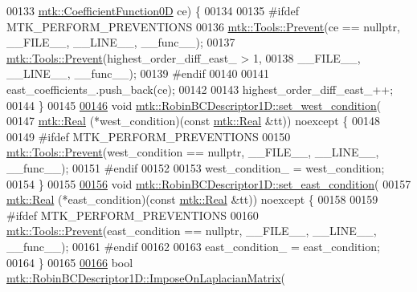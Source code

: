 \begin{DoxyCode}
00133     \hyperlink{group__c07-mim__ops_ga04276745b4d511f0f3c636d6e0df7c2d}{mtk::CoefficientFunction0D} ce) \{
00134 
00135 \textcolor{preprocessor}{  #ifdef MTK\_PERFORM\_PREVENTIONS}
00136   \hyperlink{classmtk_1_1Tools_a332324c6f25e66be9dff48c5987a3b9f}{mtk::Tools::Prevent}(ce == \textcolor{keyword}{nullptr}, \_\_FILE\_\_, \_\_LINE\_\_, \_\_func\_\_);
00137   \hyperlink{classmtk_1_1Tools_a332324c6f25e66be9dff48c5987a3b9f}{mtk::Tools::Prevent}(highest\_order\_diff\_east\_ > 1,
00138                       \_\_FILE\_\_, \_\_LINE\_\_, \_\_func\_\_);
00139 \textcolor{preprocessor}{  #endif}
00140 
00141   east\_coefficients\_.push\_back(ce);
00142 
00143   highest\_order\_diff\_east\_++;
00144 \}
00145 
\hypertarget{mtk__robin__bc__descriptor__1d_8cc_source_l00146}{}\hyperlink{classmtk_1_1RobinBCDescriptor1D_a06bfaf0126d528247c3c76fdd19f4b85}{00146} \textcolor{keywordtype}{void} \hyperlink{classmtk_1_1RobinBCDescriptor1D_a06bfaf0126d528247c3c76fdd19f4b85}{mtk::RobinBCDescriptor1D::set\_west\_condition}(
00147     \hyperlink{group__c01-roots_gac080bbbf5cbb5502c9f00405f894857d}{mtk::Real} (*west\_condition)(\textcolor{keyword}{const} \hyperlink{group__c01-roots_gac080bbbf5cbb5502c9f00405f894857d}{mtk::Real} &tt)) noexcept \{
00148 
00149 \textcolor{preprocessor}{  #ifdef MTK\_PERFORM\_PREVENTIONS}
00150   \hyperlink{classmtk_1_1Tools_a332324c6f25e66be9dff48c5987a3b9f}{mtk::Tools::Prevent}(west\_condition == \textcolor{keyword}{nullptr}, \_\_FILE\_\_, \_\_LINE\_\_, \_\_func\_\_);
00151 \textcolor{preprocessor}{  #endif}
00152 
00153   west\_condition\_ = west\_condition;
00154 \}
00155 
\hypertarget{mtk__robin__bc__descriptor__1d_8cc_source_l00156}{}\hyperlink{classmtk_1_1RobinBCDescriptor1D_a4edc92eeaaaa3f1e7f2cedfea3d35681}{00156} \textcolor{keywordtype}{void} \hyperlink{classmtk_1_1RobinBCDescriptor1D_a4edc92eeaaaa3f1e7f2cedfea3d35681}{mtk::RobinBCDescriptor1D::set\_east\_condition}(
00157     \hyperlink{group__c01-roots_gac080bbbf5cbb5502c9f00405f894857d}{mtk::Real} (*east\_condition)(\textcolor{keyword}{const} \hyperlink{group__c01-roots_gac080bbbf5cbb5502c9f00405f894857d}{mtk::Real} &tt)) noexcept \{
00158 
00159 \textcolor{preprocessor}{  #ifdef MTK\_PERFORM\_PREVENTIONS}
00160   \hyperlink{classmtk_1_1Tools_a332324c6f25e66be9dff48c5987a3b9f}{mtk::Tools::Prevent}(east\_condition == \textcolor{keyword}{nullptr}, \_\_FILE\_\_, \_\_LINE\_\_, \_\_func\_\_);
00161 \textcolor{preprocessor}{  #endif}
00162 
00163   east\_condition\_ = east\_condition;
00164 \}
00165 
\hypertarget{mtk__robin__bc__descriptor__1d_8cc_source_l00166}{}\hyperlink{classmtk_1_1RobinBCDescriptor1D_ab8446428df923c27f388a85bd3f2c6d4}{00166} \textcolor{keywordtype}{bool} \hyperlink{classmtk_1_1RobinBCDescriptor1D_ab8446428df923c27f388a85bd3f2c6d4}{mtk::RobinBCDescriptor1D::ImposeOnLaplacianMatrix}(

\end{DoxyCode}
